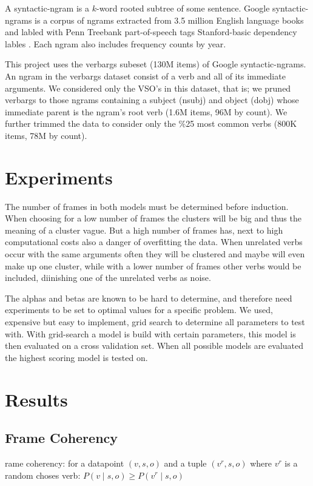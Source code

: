 \documentclass[11pt,twocolumn,DIV=11]{scrartcl}
\begin{document}
A syntactic-ngram is a $k$-word rooted subtree of some sentence.
Google syntactic-ngrams is a corpus of ngrams extracted from 3.5 million English language 
books and labled with Penn Treebank part-of-speech tags Stanford-basic dependency 
lables \citep{ngrams2013}.
Each ngram also includes frequency counts by year.

This project uses the verbargs subeset (130M items) of Google syntactic-ngrams.
An ngram in the verbargs dataset consist of a verb and all of its 
immediate arguments.
We considered only the VSO's in this dataset, that is; we pruned verbargs to
those ngrams containing a subject (nsubj) and object (dobj) whose immediate parent
is the ngram's root verb (1.6M items, 96M by count). 
We further trimmed the data to consider only the \%25 most common verbs 
(800K items, 78M by count).



\section{Experiments}
The number of frames in both models must be determined before induction. When choosing for a low number of frames the clusters will be big and thus the meaning of a cluster vague. But a high number of frames has, next to high computational costs also a danger of overfitting the data. When unrelated verbs occur with the same arguments often they will be clustered and maybe will even make up one cluster, while with a lower number of frames other verbs would be included, diinishing one of the unrelated verbs as noise.

The alphas and betas are known \citep{oconnor2013} to be hard to determine, and therefore need experiments to be set to optimal values for a specific problem. We used, expensive but easy to implement, grid search to determine all parameters to test with. With grid-search a model is build with certain parameters, this model is then evaluated on a cross validation set. When all possible models are evaluated the highest scoring model is tested on. 

\section{Results}
\label{results}
\subsection{Frame Coherency}
rame coherency: for a datapoint $(v,s,o)$ and a tuple $(v^r,s,o)$ where $v^r$ is a random choses verb: $P(v\mid s,o) \geq P(v^r\mid s,o)$  
\end{document}
